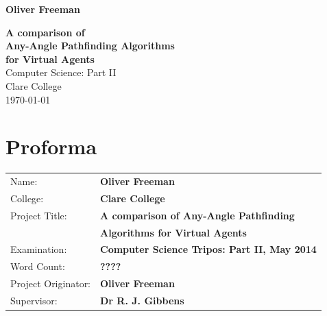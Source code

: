 \documentclass[12pt,notitlepage]{report}
\begin{document}


\pagestyle{empty}

\hfill{\LARGE \bf Oliver Freeman}

\vspace*{60mm}
\begin{center}
\Huge
{\bf A comparison of \\Any-Angle Pathfinding Algorithms \\for Virtual Agents} \\
\vspace*{5mm}
Computer Science: Part II \\
\vspace*{5mm}
Clare College \\
\vspace*{5mm}
\today  %
\end{center}

\cleardoublepage


\setcounter{page}{1}
\pagestyle{plain}

\chapter*{Proforma}

{\large
\begin{tabular}{ll}
Name:               & \bf Oliver Freeman                      \\
College:            & \bf Clare College                    \\
Project Title:      & \bf A comparison of Any-Angle Pathfinding\\ 
                    & \bf Algorithms for Virtual Agents \\
Examination:        & \bf Computer Science Tripos: Part II, May 2014        \\
Word Count:         & \bf ????\footnotemark[1]\\
Project Originator: & \bf Oliver Freeman                   \\
Supervisor:         & \bf Dr R. J. Gibbens                   \\ 
\end{tabular}
}

\end{document}
